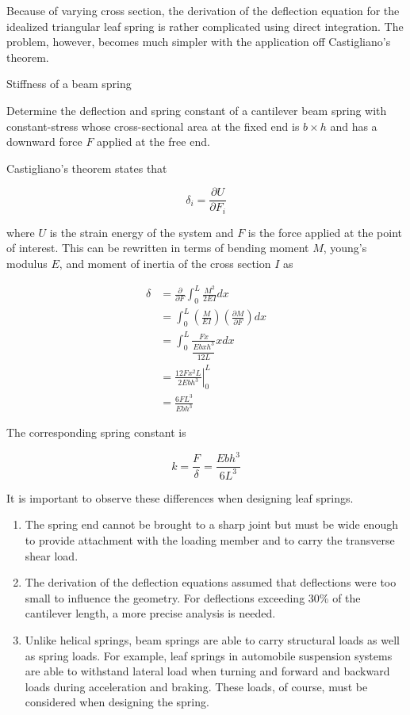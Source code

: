 \documentclass[a4paper,openany,nobib]{tufte-book}
\begin{document}
{{Because of varying cross section, the derivation of the deflection
equation for the idealized triangular leaf spring is rather complicated
using direct integration. The problem, however, becomes much simpler
with the application off Castigliano's theorem.

Stiffness of a beam spring

Determine the deflection and spring constant of a cantilever beam spring
with constant-stress whose cross-sectional area at the fixed end is
\(b \times h\) and has a downward force \(F\) applied at the free end.


Castigliano's theorem states that

$$\delta_i = \frac{\partial U}{\partial F_i}$$

where \(U\) is the strain energy of the system and \(F\) is the force
applied at the point of interest. This can be rewritten in terms of
bending moment \(M\), young's modulus \(E\), and moment of inertia of the
cross section \(I\) as

$$\begin{aligned}
    \delta  &= \frac{\partial }{\partial F} \int_0^L \frac{M^2}{2EI}dx \\ 
            &= \int_0^L \left( \frac{M}{EI} \right)\left( \frac{\partial M}{\partial F} \right)dx \\ 
            &= \int_0^L \frac{Fx}{\dfrac{Ebxh^3}{12L}}xdx \\ 
            &= \left. \frac{12Fx^2L}{2Ebh^3} \right|_0^L \\ 
            &= \frac{6FL^3}{Ebh^3}
  \end{aligned}$$

The corresponding spring constant is

$$k = \frac{F}{\delta } = \frac{Ebh^3}{6L^3}$$

It is important to observe these differences when designing leaf
springs.

\begin{enumerate}
\item The spring end cannot be brought to a sharp joint but must be wide
enough to provide attachment with the loading member and to carry the
transverse shear load.

\item The derivation of the deflection equations assumed that deflections
were too small to influence the geometry. For deflections exceeding
30\% of the cantilever length, a more precise analysis is needed.

\item Unlike helical springs, beam springs are able to carry structural
loads as well as spring loads. For example, leaf springs in
automobile suspension systems are able to withstand lateral load when
turning and forward and backward loads during acceleration and
braking. These loads, of course, must be considered when designing
the spring.
\end{enumerate}

}}
\end{document}
